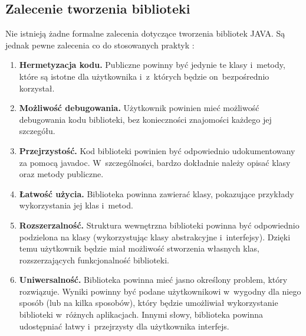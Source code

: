 \subsection{Zalecenie tworzenia biblioteki}
Nie istnieją żadne formalne zalecenia dotyczące tworzenia bibliotek JAVA. Są jednak pewne zalecenia co do stosowanych praktyk \cite{biblioteka_standard}:
\begin{enumerate}
\item \textbf{Hermetyzacja kodu.} Publiczne powinny być jedynie te klasy i~metody, które są istotne dla użytkownika i~z~których będzie on~bezpośrednio korzystał.
\item \textbf{Możliwość debugowania.} Użytkownik powinien mieć możliwość debugowania kodu biblioteki, bez konieczności znajomości każdego jej szczegółu.
\item  \textbf{Przejrzystość.} Kod biblioteki powinien być odpowiednio udokumentowany za pomocą javadoc. W~szczególności, bardzo dokładnie należy opisać klasy oraz metody publiczne.
\item \textbf{Łatwość użycia.} Biblioteka powinna zawierać klasy, pokazujące przykłady wykorzystania jej klas i~metod.
\item \textbf{ Rozszerzalność.} Struktura wewnętrzna biblioteki powinna być odpowiednio podzielona na klasy (wykorzystując klasy abstrakcyjne i~interfejsy). Dzięki temu użytkownik będzie miał możliwość stworzenia własnych klas, rozszerzających funkcjonalność biblioteki.
\item \textbf{Uniwersalność.} Biblioteka powinna mieć jasno określony problem, który rozwiązuje. Wyniki powinny być podane użytkownikowi w~wygodny dla niego sposób (lub na kilka sposobów), 
który będzie umożliwiał wykorzystanie biblioteki w~różnych aplikacjach. Innymi słowy, biblioteka powinna udostępniać łatwy i~przejrzysty dla użytkownika interfejs.
\end{enumerate}


